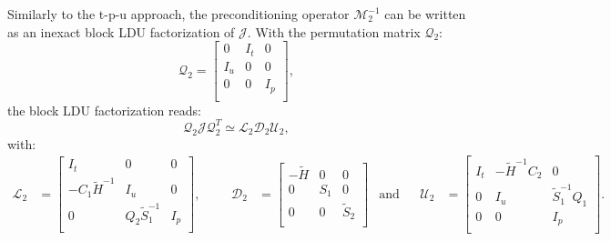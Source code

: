 \documentclass[10pt,a4paper]{amsart}
\newcommand{\Mat}[1]{#1}
\newcommand{\tH}{\widetilde{H}}
\newcommand{\tS}{\widetilde{S}}
\begin{document}
Similarly to the t-p-u approach, the preconditioning operator $\mathcal{M}_2^{-1}$ can be written as an inexact block LDU factorization of $\mathcal{J}$. With
the permutation matrix $\mathcal{Q}_2$:
\begin{equation}
  \mathcal{Q}_2 = \begin{bmatrix}
    \Mat{0} & \Mat{I}_t & \Mat{0} \\
    \Mat{I}_u & \Mat{0} & \Mat{0} \\
    \Mat{0} & \Mat{0} & \Mat{I}_p \\
  \end{bmatrix},
  \label{eq:Q2}
\end{equation}
the block LDU factorization reads:
\begin{equation}
  \mathcal{Q}_2 \mathcal{J} \mathcal{Q}_2^T \simeq \mathcal{L}_2 \mathcal{D}_2 \mathcal{U}_2,
\end{equation}
with:
\begin{align}
  \mathcal{L}_2 &= \begin{bmatrix}
    \Mat{I}_t & \Mat{0} & \Mat{0} \\
    -\Mat{C}_1\Mat{\tH}^{-1} & \Mat{I}_u & \Mat{0} \\
    \Mat{0} & \Mat{Q}_2\Mat{\tS}_1^{-1} & \Mat{I}_p \\
  \end{bmatrix}, &&&
  \mathcal{D}_2 &= \begin{bmatrix}
    -\Mat{\tH} & \Mat{0} & \Mat{0} \\
    \Mat{0} & \Mat{S}_1 & \Mat{0} \\
    \Mat{0} & \Mat{0} & \Mat{\tS}_2 \\
  \end{bmatrix} & \text{and} &&
  \mathcal{U}_2 &= \begin{bmatrix}
    \Mat{I}_t & -\Mat{\tH}^{-1}\Mat{C}_2 & \Mat{0} \\
    \Mat{0} & \Mat{I}_u & \Mat{\tS}_1^{-1}\Mat{Q}_1 \\
    \Mat{0} & \Mat{0} & \Mat{I}_p \\
  \end{bmatrix}.
  \label{eq:LDU2}
\end{align}
\end{document}
